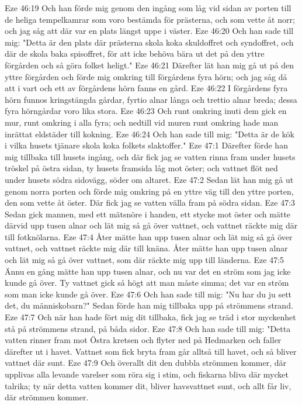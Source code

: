 Eze 46:19  Och han förde mig genom den ingång som låg vid sidan av porten till de heliga tempelkamrar som voro bestämda för prästerna, och som vette åt norr; och jag såg att där var en plats längst uppe i väster.
Eze 46:20  Och han sade till mig: "Detta är den plats där prästerna skola koka skuldoffret och syndoffret, och där de skola baka spisoffret, för att icke behöva bära ut det på den yttre förgården och så göra folket heligt."
Eze 46:21  Därefter lät han mig gå ut på den yttre förgården och förde mig omkring till förgårdens fyra hörn; och jag såg då att i vart och ett av förgårdens hörn fanns en gård.
Eze 46:22  I förgårdens fyra hörn funnos kringstängda gårdar, fyrtio alnar långa och trettio alnar breda; dessa fyra hörngårdar voro lika stora.
Eze 46:23  Och runt omkring inuti dem gick en mur, runt omkring i alla fyra; och nedtill vid muren runt omkring hade man inrättat eldstäder till kokning.
Eze 46:24  Och han sade till mig: "Detta är de kök i vilka husets tjänare skola koka folkets slaktoffer."
Eze 47:1  Därefter förde han mig tillbaka till husets ingång, och där fick jag se vatten rinna fram under husets tröskel på östra sidan, ty husets framsida låg mot öster; och vattnet flöt ned under husets södra sidovägg, söder om altaret.
Eze 47:2  Sedan lät han mig gå ut genom norra porten och förde mig omkring på en yttre väg till den yttre porten, den som vette åt öster. Där fick jag se vatten välla fram på södra sidan.
Eze 47:3  Sedan gick mannen, med ett mätsnöre i handen, ett stycke mot öster och mätte därvid upp tusen alnar och lät mig så gå över vattnet, och vattnet räckte mig där till fotknölarna.
Eze 47:4  Åter mätte han upp tusen alnar och lät mig så gå över vattnet, och vattnet räckte mig där till knäna. Åter mätte han upp tusen alnar och lät mig så gå över vattnet, som där räckte mig upp till länderna.
Eze 47:5  Ännu en gång mätte han upp tusen alnar, och nu var det en ström som jag icke kunde gå över. Ty vattnet gick så högt att man måste simma; det var en ström som man icke kunde gå över.
Eze 47:6  Och han sade till mig: "Nu har du ju sett det, du människobarn?" Sedan förde han mig tillbaka upp på strömmens strand.
Eze 47:7  Och när han hade fört mig dit tillbaka, fick jag se träd i stor myckenhet stå på strömmens strand, på båda sidor.
Eze 47:8  Och han sade till mig: "Detta vatten rinner fram mot Östra kretsen och flyter ned på Hedmarken och faller därefter ut i havet. Vattnet som fick bryta fram går alltså till havet, och så bliver vattnet där sunt.
Eze 47:9  Och överallt dit den dubbla strömmen kommer, där upplivas alla levande varelser som röra sig i stim, och fiskarna bliva där mycket talrika; ty när detta vatten kommer dit, bliver havsvattnet sunt, och allt får liv, där strömmen kommer.
